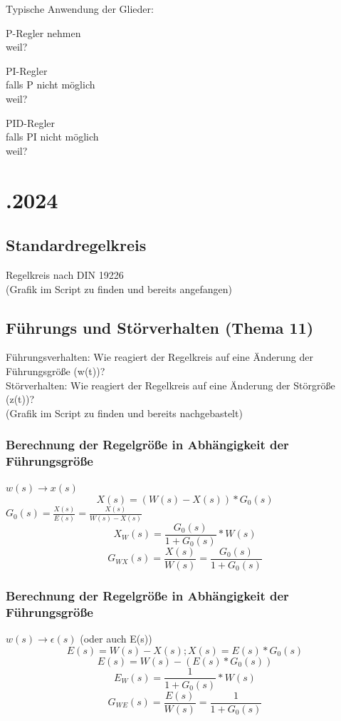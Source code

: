\documentclass{article}
\begin{document}
Typische Anwendung der Glieder: 
\begin{multicols}{3}
	P-Regler nehmen \\
	weil?

	\columnbreak
	PI-Regler \\
	falls P nicht möglich \\
	weil?

	\columnbreak
	PID-Regler \\
	falls PI nicht möglich \\
	weil?
\end{multicols}


\newpage
\section*{.2024}
\subsection*{Standardregelkreis}
Regelkreis nach DIN 19226 \\
(Grafik im Script zu finden und bereits angefangen)

\subsection*{Führungs und Störverhalten (Thema 11)}
Führungsverhalten: Wie reagiert der Regelkreis auf eine Änderung der Führungsgröße (w(t))? \\
Störverhalten: Wie reagiert der Regelkreis auf eine Änderung der Störgröße (z(t))? \\
(Grafik im Script zu finden und bereits nachgebastelt)

\subsubsection*{Berechnung der Regelgröße in Abhängigkeit der Führungsgröße}
$w(s) \rightarrow x(s)$
\[
X(s)=(W(s)-X(s)) * G_0(s)
\]
$G_0(s)=\frac{X(s)}{E(s)} = \frac{X(s)}{W(s)-X(s)}$
\[
X_W(s)=\frac{G_0(s)}{1+G_0(s)} * W(s)
\]
\[
G_{WX}(s)=\frac{X(s)}{W(s)} = \frac{G_0(s)}{1+G_0(s)}
\]

\subsubsection*{Berechnung der Regelgröße in Abhängigkeit der Führungsgröße}
$w(s) \rightarrow \epsilon(s)$ (oder auch E(s))
\[
E(s)=W(s)-X(s); X(s)=E(s)*G_0(s)
\]
\[
E(s)=W(s)-(E(s)*G_0(s))
\]
\[
E_W(s)=\frac{1}{1+G_0(s)}*W(s)
\]
\[
G_{WE}(s)=\frac{E(s)}{W(s)}=\frac{1}{1+G_0(s)}
\]
\end{document}
